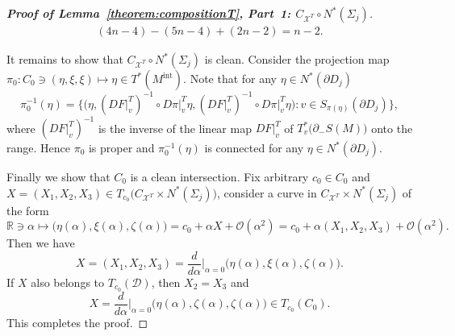 \documentclass[a4paper,11pt,reqno]{amsart}
\numberwithin{equation}{section}
\theoremstyle{definition}
\theoremstyle{remark}
\begin{document}
\begin{proof}[{\bf Proof of Lemma~\ref{theorem:compositionT}, Part~1: $C_{\mathcal{X}^T}{\circ}N^\ast(\Sigma_j)$}]
\begin{align*}
  (4n-4)-(5n-4)+(2n-2)
  =
  n-2.
\end{align*}
%
%
\par
%
%
It remains to show that $C_{\mathcal{X}^T}{\circ}N^\ast(\Sigma_j)$ is clean. 
Consider the projection map $\pi_0:C_0\ni(\eta,\xi,\xi)\mapsto\eta\in{T^\ast(M^\text{int})}$. 
Note that for any $\eta \in N^\ast(\partial{D_j})$
%
%
$$
\pi_0^{-1}(\eta)
=
\bigl\{
\bigr(\eta,(DF\vert^T_v)^{-1}{\circ}D\pi\vert^T_v\eta,(DF\vert^T_v)^{-1}{\circ}D\pi\vert^T_v\eta\bigr): 
v \in S_{\pi(\eta)}(\partial{D_j}) 
\bigr\}, 
$$
%
%
where $(DF\vert^T_v)^{-1}$ is the inverse of 
the linear map $DF\vert^T_v$ of $T^\ast_v\bigl(\partial_-S(M)\bigr)$ onto the range. 
Hence $\pi_0$ is proper and $\pi_0^{-1}(\eta)$ is connected for any $\eta \in N^\ast(\partial{D_j})$. 
%
%
\par
%
%
Finally we show that $C_0$ is a clean intersection. 
Fix arbitrary $c_0 \in C_0$ and $X=(X_1,X_2,X_3) \in T_{c_0}\bigl(C_{\mathcal{X}^T}{\times}N^\ast(\Sigma_j)\bigr)$, consider a curve in $C_{\mathcal{X}^T}{\times}N^\ast(\Sigma_j)$ of the form 
%
%
$$
\mathbb{R}\ni\alpha \mapsto 
\bigl(\eta(\alpha),\xi(\alpha),\zeta(\alpha)\bigr)
=
c_0+\alpha{X}+\mathcal{O}(\alpha^2)
=
c_0+\alpha(X_1,X_2,X_3)+\mathcal{O}(\alpha^2).
$$
%
%
Then we have 
%
%
$$
X
=
(X_1,X_2,X_3)
=
\frac{d}{d\alpha}\bigg\vert_{\alpha=0}
\bigl(\eta(\alpha),\xi(\alpha),\zeta(\alpha)\bigr). 
$$
%
%
If $X$ also belongs to $T_{c_0}(\mathcal{D})$, then $X_2=X_3$ and 
%
%
$$
X=\frac{d}{d\alpha}\bigg\vert_{\alpha=0}
\bigl(\eta(\alpha),\zeta(\alpha),\zeta(\alpha)\bigr)
\in T_{c_0}(C_0). 
$$
%
%
This completes the proof. 
\end{proof}
%
%
%
%
\end{document}
